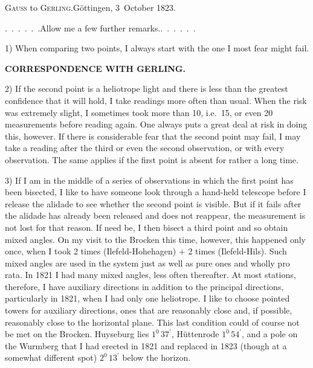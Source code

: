 \begin{center}
\textsc{Gauss} to \textsc{Gerling}.\quad Göttingen, 3~October 1823.
\end{center}

\par\noindent\hspace*{\parindent}\mbox{.\ .\ .\ .\ .\ .}\quad Allow me a few further \mbox{remarks.\quad\mbox{.\ .\ .\ .\ .\ .}}
\par\noindent\hspace*{\parindent}1) When comparing two points, I always start with the one
I most fear might fail.
\par\clearpage
\noindent{}\hfill{\small\textbf{CORRESPONDENCE WITH GERLING.}}\hfill\null\par\medskip
\par\noindent\hspace*{\parindent}2) If the second point is a heliotrope light and there is less than the greatest confidence
that it will hold, I take readings more often than usual. When the risk
was extremely slight, I sometimes took more than 10, i.e.\ 15,
or even 20 measurements before reading again. One always puts a great deal
at risk in doing this, however. If there is considerable fear that the second
point may fail, I may take a reading after the third or even the second observation, or with
every observation. The same applies if the first point is absent for rather a long
time.
\par\noindent\hspace*{\parindent}3) If I am in the middle of a series of observations in which the first point
has been bisected, I like to have someone look through a hand-held telescope before I release
the alidade to see whether the second point is visible. But if it fails
after the alidade has already been released and does not reappear, the
measurement is not lost for that reason. If need be, I then bisect a third point
and so obtain mixed angles. On my visit to the Brocken this time,
however, this happened only once, when I took 2 times
(Ilefeld-Hohehagen) \(+\) 2 times (Ilefeld-Hils). Such mixed angles are used in the
system just as well as pure ones and wholly pro rata. In 1821 I had
many mixed angles, less often thereafter. At most stations, therefore, I have
auxiliary directions in addition to the principal directions, particularly in
1821, when I had only one heliotrope. I like to choose pointed towers for
auxiliary directions, ones that are reasonably close and, if possible,
reasonably close to the horizontal plane. This last condition could of course
not be met on the Brocken. Huyseburg lies \(1^{0}\,37^{\prime}\), Hüttenrode \(1^{0}\,54^{\prime}\), and a pole
on the Wurmberg that I had erected in 1821 and replaced in 1823
(though at a somewhat different spot) \(2^{0}\,13^{\prime}\) below the horizon.
\par
